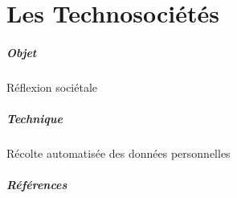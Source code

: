 \chapter{Les Technosociétés}
\paragraph{Objet} Réflexion sociétale
\paragraph{Technique} Récolte automatisée des données personnelles
\paragraph{Références}
\cite{Damasio0}
\cite{Damasio1}
\cite{Damasio2}
\cite{Deleuze0}
\cite{Foucault0}
\cite{Huxley0}
\cite{Klein0}
\cite{Marx0}
\cite{Marx1}
\cite{Moore0}
\cite{Negri0}
\cite{Nietzsche0}
\cite{Orwell0}
\cite{Pieces0}
\cite{Rabhi0}
\cite{Rabhi1}
\cite{Rufin0}
\cite{Arte0}
\cite{GhostInTheShell}
\cite{Gunnm}
\cite{PsychoPass}



 
